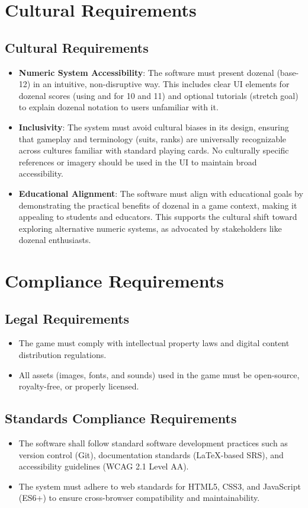 \documentclass[12pt]{article}
\begin{document}
\section{Cultural Requirements}
\subsection{Cultural Requirements}

\begin{itemize}
    \item \textbf{Numeric System Accessibility}: The software must present dozenal (base-12) in an intuitive, non-disruptive way. This includes clear UI elements for dozenal scores (using  and  for 10 and 11) and optional tutorials (stretch goal) to explain dozenal notation to users unfamiliar with it.
    \item \textbf{Inclusivity}: The system must avoid cultural biases in its design, ensuring that gameplay and terminology (suits, ranks) are universally recognizable across cultures familiar with standard playing cards. No culturally specific references or imagery should be used in the UI to maintain broad accessibility.
    \item \textbf{Educational Alignment}: The software must align with educational goals by demonstrating the practical benefits of dozenal in a game context, making it appealing to students and educators. This supports the cultural shift toward exploring alternative numeric systems, as advocated by stakeholders like dozenal enthusiasts.
\end{itemize}

\section{Compliance Requirements}

\subsection{Legal Requirements}
\begin{itemize}
  \item The game must comply with intellectual property laws and digital content distribution regulations.
  \item All assets (images, fonts, and sounds) used in the game must be open-source, royalty-free, or properly licensed.
\end{itemize}


\subsection{Standards Compliance Requirements}
\begin{itemize}
  \item The software shall follow standard software development practices such as version control (Git), documentation standards (LaTeX-based SRS), and accessibility guidelines (WCAG 2.1 Level AA).
  \item The system must adhere to web standards for HTML5, CSS3, and JavaScript (ES6+) to ensure cross-browser compatibility and maintainability.
\end{itemize}
\end{document}
